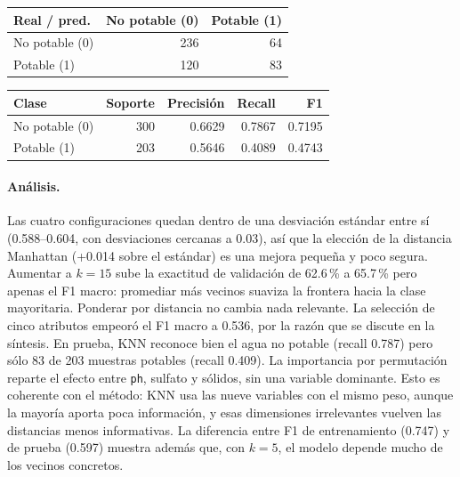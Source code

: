 \documentclass[11pt]{article}
\begin{document}
\begin{table}[H]\footnotesize\begin{minipage}[t]{0.44\linewidth}\centering{}\begin{tabular}{lrr}\toprule
Real / pred. & No potable (0) & Potable (1) \\ \midrule
No potable (0) & 236 & 64 \\
Potable (1) & 120 & 83 \\
\bottomrule\end{tabular}\end{minipage}\hfill\begin{minipage}[t]{0.52\linewidth}\centering{}\begin{tabular}{lrrrr}\toprule
Clase & Soporte & Precisión & Recall & F1 \\ \midrule
No potable (0) & 300 & 0.6629 & 0.7867 & 0.7195 \\
Potable (1) & 203 & 0.5646 & 0.4089 & 0.4743 \\
\bottomrule\end{tabular}\end{minipage}\end{table}

\paragraph{Análisis.} Las cuatro configuraciones quedan dentro de una desviación estándar entre sí
(0.588--0.604, con desviaciones cercanas a 0.03), así que la elección de la distancia
Manhattan (+0.014 sobre el estándar) es una mejora pequeña y poco segura. Aumentar a
$k=15$ sube la exactitud de validación de 62.6\,\% a 65.7\,\% pero apenas el F1 macro:
promediar más vecinos suaviza la frontera hacia la clase mayoritaria. Ponderar por
distancia no cambia nada relevante. La selección de cinco atributos empeoró el F1 macro
a 0.536, por la razón que se discute en la síntesis. En prueba, KNN reconoce bien el
agua no potable (recall 0.787) pero sólo 83 de 203 muestras potables (recall 0.409).
La importancia por permutación reparte el efecto entre \texttt{ph}, sulfato y sólidos,
sin una variable dominante. Esto es coherente con el método: KNN usa las nueve
variables con el mismo peso, aunque la mayoría aporta poca información, y esas
dimensiones irrelevantes vuelven las distancias menos informativas. La diferencia entre
F1 de entrenamiento (0.747) y de prueba (0.597) muestra además que, con $k=5$, el
modelo depende mucho de los vecinos concretos.
\end{document}
